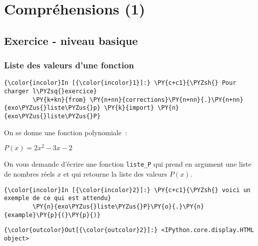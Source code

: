     
    
    
    

    

    \hypertarget{compruxe9hensions-1}{%
\section{Compréhensions (1)}\label{compruxe9hensions-1}}

    \hypertarget{exercice---niveau-basique}{%
\subsection{Exercice - niveau basique}\label{exercice---niveau-basique}}

    \hypertarget{liste-des-valeurs-dune-fonction}{%
\subsubsection{Liste des valeurs d'une
fonction}\label{liste-des-valeurs-dune-fonction}}

    \begin{Verbatim}[commandchars=\\\{\},frame=single,framerule=0.3mm,rulecolor=\color{cellframecolor}]
{\color{incolor}In [{\color{incolor}1}]:} \PY{c+c1}{\PYZsh{} Pour charger l\PYZsq{}exercice}
        \PY{k+kn}{from} \PY{n+nn}{corrections}\PY{n+nn}{.}\PY{n+nn}{exo\PYZus{}liste\PYZus{}p} \PY{k}{import} \PY{n}{exo\PYZus{}liste\PYZus{}P}
\end{Verbatim}


    On se donne une fonction polynomiale~:

\(P(x) = 2x^2 - 3x - 2\)

    On vous demande d'écrire une fonction \texttt{liste\_P} qui prend en
argument une liste de nombres réels \(x\) et qui retourne la liste des
valeurs \(P(x)\).

    \begin{Verbatim}[commandchars=\\\{\},frame=single,framerule=0.3mm,rulecolor=\color{cellframecolor}]
{\color{incolor}In [{\color{incolor}2}]:} \PY{c+c1}{\PYZsh{} voici un exemple de ce qui est attendu}
        \PY{n}{exo\PYZus{}liste\PYZus{}P}\PY{o}{.}\PY{n}{example}\PY{p}{(}\PY{p}{)}
\end{Verbatim}


\begin{Verbatim}[commandchars=\\\{\},frame=single,framerule=0.3mm,rulecolor=\color{cellframecolor}]
{\color{outcolor}Out[{\color{outcolor}2}]:} <IPython.core.display.HTML object>
\end{Verbatim}
            
